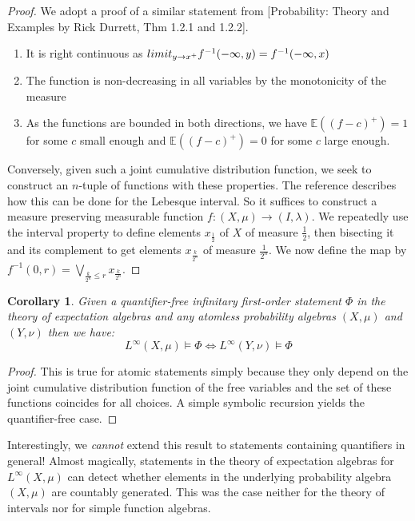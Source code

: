 \documentclass[a4paper]{amsproc}
\theoremstyle{plain}
\newtheorem{corollary}[theorem]{Corollary}
\theoremstyle{definition}
\theoremstyle{remark}
\numberwithin{equation}{section}
\DeclareMathOperator*{\limit}{lim}
\begin{document}
\begin{proof}
We adopt a proof of a similar statement from [Probability: Theory and Examples by Rick Durrett, Thm 1.2.1 and 1.2.2].
\begin{enumerate}
\item It is right continuous as $\\limit_{y\rightarrow x^+}f^{-1}(-\infty,y)=f^{-1}(-\infty, x)$
\item The function is non-decreasing in all variables by the monotonicity of the measure
\item As the functions are bounded in both directions, we have $\mathbb{E}((f-c)^+)=1$ for some $c$ small enough and $\mathbb{E}((f-c)^+)=0$ for some $c$ large enough.
\end{enumerate}
Conversely, given such a joint cumulative distribution function, we seek to construct an $n$-tuple of functions with these properties. The reference describes how this can be done for the Lebesque interval. So it suffices to construct a measure preserving measurable function $f:(X,\mu)\rightarrow (I,\lambda)$. We repeatedly use the interval property to define elements $x_{\frac{1}{2}}$ of $X$ of measure $\frac{1}{2}$, then bisecting it and its complement to get elements $x_{\frac{k}{2^n}}$ of measure $\frac{1}{2^n}$. We now define the map by $f^{-1}(0,r)=\bigvee_{\frac{k}{2^n}\leq r} x_{\frac{k}{2^n}} $. %
\end{proof}
\begin{corollary}\label{quantifierfreeLinfty}
Given a \emph{quantifier-free} infinitary first-order statement $\Phi$ in the theory of expectation algebras and any atomless probability algebras $(X,\mu)$ and $(Y,\nu)$ then we have:
\[L^\infty(X,\mu)\vDash\Phi \iff L^\infty(Y,\nu)\vDash \Phi \]
\end{corollary}
\begin{proof}
This is true for atomic statements simply because they only depend on the joint cumulative distribution function of the free variables and the set of these functions coincides for all choices. A simple symbolic recursion yields the quantifier-free case.
\end{proof}
Interestingly, we \emph{cannot} extend this result to statements containing quantifiers in general! Almost magically, statements in the theory of expectation algebras for $L^\infty(X,\mu)$ can detect whether elements in the underlying probability algebra $(X,\mu)$ are countably generated. This was the case neither for the theory of intervals nor for simple function algebras.
\end{document}
